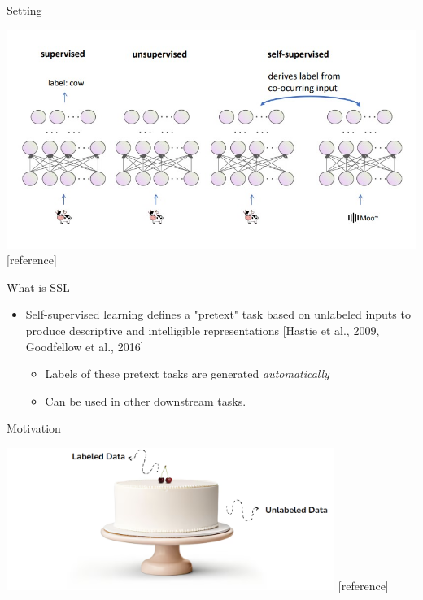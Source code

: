 \documentclass[serif, aspectratio=169]{beamer}
\begin{document}
\begin{frame}{Setting}
    \begin{center}
	        \includegraphics[width=\textwidth]{pic/SSL-Comparison.jpg} %
	        [reference]
	    \end{center}
\end{frame}

\begin{frame}{What is SSL}
    \begin{itemize}
        \item  Self-supervised learning defines a "pretext" task based on unlabeled inputs to produce descriptive and intelligible representations [Hastie et al., 2009, Goodfellow et al., 2016]
        \begin{itemize}
	\item Labels of these pretext tasks are generated \textit{automatically}
	\item Can be used in other downstream tasks.
        \end{itemize}
    \end{itemize}
\end{frame}


\begin{frame}[t]{Motivation}
\begin{center}
	\includegraphics[width=0.8\textwidth]{pic/Cherry on top.png} %
	[reference]
\end{center}

\end{frame}
\end{document}
